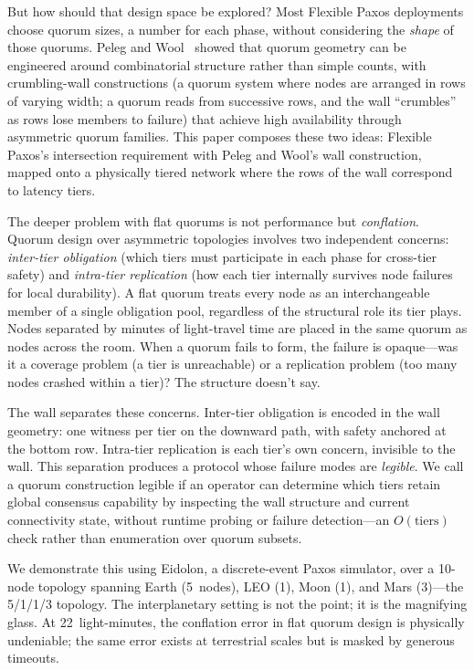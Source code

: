 \documentclass[11pt]{article}
\begin{document}
But how should that design space be explored? Most Flexible Paxos deployments choose quorum sizes, a number for each phase, without considering the \emph{shape} of those quorums. Peleg and Wool~\cite{peleg1995} showed that quorum geometry can be engineered around combinatorial structure rather than simple counts, with crumbling-wall constructions (a quorum system where nodes are arranged in rows of varying width; a quorum reads from successive rows, and the wall ``crumbles'' as rows lose members to failure) that achieve high availability through asymmetric quorum families. This paper composes these two ideas: Flexible Paxos's intersection requirement with Peleg and Wool's wall construction, mapped onto a physically tiered network where the rows of the wall correspond to latency tiers.

The deeper problem with flat quorums is not performance but \emph{conflation}. Quorum design over asymmetric topologies involves two independent concerns: \emph{inter-tier obligation} (which tiers must participate in each phase for cross-tier safety) and \emph{intra-tier replication} (how each tier internally survives node failures for local durability). A flat quorum treats every node as an interchangeable member of a single obligation pool, regardless of the structural role its tier plays. Nodes separated by minutes of light-travel time are placed in the same quorum as nodes across the room. When a quorum fails to form, the failure is opaque---was it a coverage problem (a tier is unreachable) or a replication problem (too many nodes crashed within a tier)? The structure doesn't say.

The wall separates these concerns. Inter-tier obligation is encoded in the wall geometry: one witness per tier on the downward path, with safety anchored at the bottom row. Intra-tier replication is each tier's own concern, invisible to the wall. This separation produces a protocol whose failure modes are \emph{legible}. We call a quorum construction legible if an operator can determine which tiers retain global consensus capability by inspecting the wall structure and current connectivity state, without runtime probing or failure detection---an $O(\text{tiers})$ check rather than enumeration over quorum subsets.

We demonstrate this using Eidolon, a discrete-event Paxos simulator, over a 10-node topology spanning Earth (5~nodes), LEO (1), Moon (1), and Mars (3)---the 5/1/1/3 topology. The interplanetary setting is not the point; it is the magnifying glass. At 22~light-minutes, the conflation error in flat quorum design is physically undeniable; the same error exists at terrestrial scales but is masked by generous timeouts.
\end{document}
